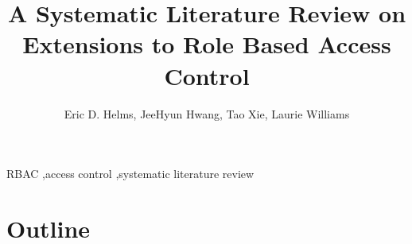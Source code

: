 \documentclass[3p,12pt]{elsarticle}
\begin{document}
\begin{frontmatter}

\title{A Systematic Literature Review on Extensions to Role Based Access Control}

\author{Eric D. Helms, JeeHyun Hwang, Tao Xie, Laurie Williams}
\address{North Carolina State University}
\address{Department of Computer Science}
\address{890 Oval Drive, Box 8206}
\address{Raleigh, NC 27695-2858}




\begin{keyword}
RBAC \sep access control \sep systematic literature review
\end{keyword}

\end{frontmatter}













\section{Outline}
\end{document}
